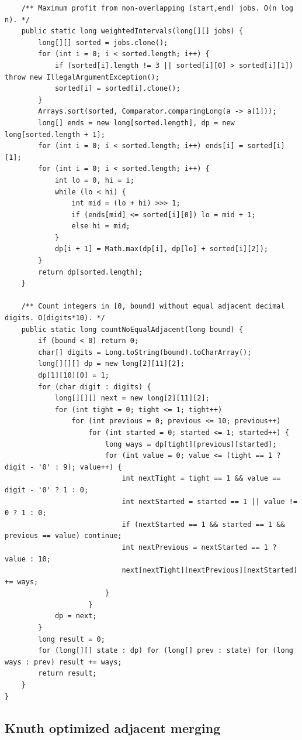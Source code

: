 \documentclass[10pt,letterpaper]{article}
\begin{document}
\begin{lstlisting}
    /** Maximum profit from non-overlapping [start,end) jobs. O(n log n). */
    public static long weightedIntervals(long[][] jobs) {
        long[][] sorted = jobs.clone();
        for (int i = 0; i < sorted.length; i++) {
            if (sorted[i].length != 3 || sorted[i][0] > sorted[i][1]) throw new IllegalArgumentException();
            sorted[i] = sorted[i].clone();
        }
        Arrays.sort(sorted, Comparator.comparingLong(a -> a[1]));
        long[] ends = new long[sorted.length], dp = new long[sorted.length + 1];
        for (int i = 0; i < sorted.length; i++) ends[i] = sorted[i][1];
        for (int i = 0; i < sorted.length; i++) {
            int lo = 0, hi = i;
            while (lo < hi) {
                int mid = (lo + hi) >>> 1;
                if (ends[mid] <= sorted[i][0]) lo = mid + 1;
                else hi = mid;
            }
            dp[i + 1] = Math.max(dp[i], dp[lo] + sorted[i][2]);
        }
        return dp[sorted.length];
    }

    /** Count integers in [0, bound] without equal adjacent decimal digits. O(digits*10). */
    public static long countNoEqualAdjacent(long bound) {
        if (bound < 0) return 0;
        char[] digits = Long.toString(bound).toCharArray();
        long[][][] dp = new long[2][11][2];
        dp[1][10][0] = 1;
        for (char digit : digits) {
            long[][][] next = new long[2][11][2];
            for (int tight = 0; tight <= 1; tight++)
                for (int previous = 0; previous <= 10; previous++)
                    for (int started = 0; started <= 1; started++) {
                        long ways = dp[tight][previous][started];
                        for (int value = 0; value <= (tight == 1 ? digit - '0' : 9); value++) {
                            int nextTight = tight == 1 && value == digit - '0' ? 1 : 0;
                            int nextStarted = started == 1 || value != 0 ? 1 : 0;
                            if (nextStarted == 1 && started == 1 && previous == value) continue;
                            int nextPrevious = nextStarted == 1 ? value : 10;
                            next[nextTight][nextPrevious][nextStarted] += ways;
                        }
                    }
            dp = next;
        }
        long result = 0;
        for (long[][] state : dp) for (long[] prev : state) for (long ways : prev) result += ways;
        return result;
    }
}
\end{lstlisting}
\subsection{Knuth optimized adjacent merging}
\end{document}
